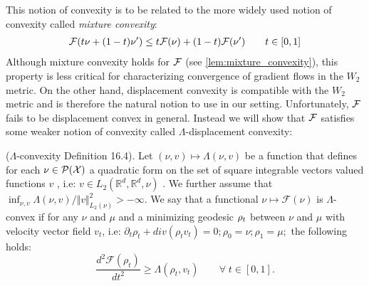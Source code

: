 This notion of convexity is to be related to the more widely used notion of convexity called \textit{mixture convexity}:
\begin{align}
	{{\mathcal F}}(t\nu +(1-t)\nu')\leq t{{\mathcal F}}(\nu)+(1-t){{\mathcal F}}(\nu') \qquad t\in [0,1]
\end{align}
Although mixture convexity holds for ${{\mathcal F}}$ (see \cref{lem:mixture_convexity}), this property is less critical for characterizing convergence of gradient flows in the $W_2$ metric. On the other hand, displacement convexity is compatible with the $W_2$ metric \cite{Bottou:2017} and is therefore the natural notion to use in our setting. Unfortunately, ${{\mathcal F}}$ fails to be displacement convex in general. Instead we will show that ${{\mathcal F}}$ satisfies some weaker notion of convexity called $\Lambda$-displacement convexity:
%
\begin{definition}\label{def:lambda-convexity}
($\Lambda$-convexity \cite{Villani:2009} Definition 16.4). Let $(\nu,v)\mapsto\Lambda(\nu,v)$
be a function that defines for each $\nu \in \mathcal{P}({{\mathcal X}})$
a quadratic form on the set of square integrable vectors valued functions
$v$ , i.e: $v\in L_{2}(\mathbb{R}^{d},\mathbb{R}^{d},\nu)$ . We
further assume that $\inf_{\nu,v}\Lambda(\nu,v)/\Vert v\Vert_{L_{2}(\nu)}^{2}>-\infty$.
We say that a functional $\nu\mapsto\mathcal{F}(\nu)$ is $\Lambda$-convex
if for any $\nu$ and $\mu$ and a minimizing geodesic $\text{\ensuremath{\rho_{t}}}$
between $\nu$ and $\mu$ with velocity vector field $v_{t}$, i.e:
$\partial_{t}\rho_{t}+div(\rho_{t}v_{t})=0;\rho_{0}=\nu;\rho_{1}=\mu;$
the following holds:
\begin{equation*}
\frac{d^{2}\mathcal{F}(\rho_{t})}{dt^{2}}\geq\Lambda(\rho_{t},v_{t})\qquad\forall\; t\in[0,1].
\end{equation*}
\end{definition}

